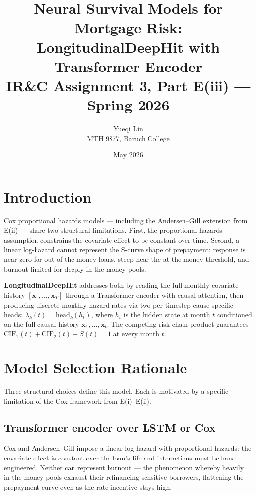 \documentclass[11pt,a4paper]{article}
\title{\vspace{-1.5em}\textbf{Neural Survival Models for Mortgage Risk:\\
LongitudinalDeepHit with Transformer Encoder}\\[0.3em]
\large IR\&C Assignment 3, Part E(iii) --- Spring 2026}
\author{Yueqi Lin\\\small MTH 9877, Baruch College}
\date{May 2026}
\begin{document}
\maketitle
\vspace{-1.2em}

\section{Introduction}

Cox proportional hazards models --- including the Andersen--Gill extension from E(ii) ---
share two structural limitations. First, the proportional hazards assumption constrains
the covariate effect to be constant over time. Second, a linear log-hazard cannot represent
the S-curve shape of prepayment: response is near-zero for out-of-the-money loans,
steep near the at-the-money threshold, and burnout-limited for deeply in-the-money pools.

\textbf{LongitudinalDeepHit} addresses both by reading the full monthly covariate history
$[\mathbf{x}_1, \ldots, \mathbf{x}_T]$ through a Transformer encoder with causal attention,
then producing discrete monthly hazard rates via two per-timestep cause-specific heads:
$\lambda_k(t) = \text{head}_k(h_t)$, where $h_t$ is the hidden state at month $t$ conditioned
on the full causal history $\mathbf{x}_1, \ldots, \mathbf{x}_t$. The competing-risk chain product
guarantees $\text{CIF}_1(t) + \text{CIF}_2(t) + S(t) = 1$ at every month $t$.

\section{Model Selection Rationale}

Three structural choices define this model. Each is motivated by a specific limitation of the Cox framework from E(i)–E(ii).

\subsection{Transformer encoder over LSTM or Cox}

Cox and Andersen--Gill impose a linear log-hazard with proportional hazards: the covariate effect is constant over the loan's life and interactions must be hand-engineered. Neither can represent burnout --- the phenomenon whereby heavily in-the-money pools exhaust their refinancing-sensitive borrowers, flattening the prepayment curve even as the rate incentive stays high.
\end{document}
